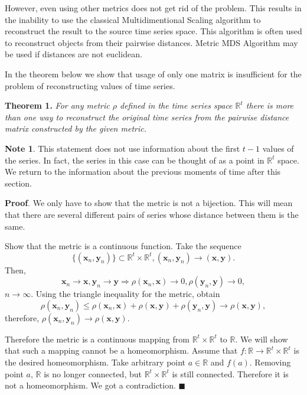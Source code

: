 \documentclass[12pt]{article}
\begin{document}
However, even using other metrics does not get rid of the problem. This results in the inability to use the classical Multidimentional Scaling \cite{MDS} algorithm to reconstruct the result to the source time series space. This algorithm is often used to reconstruct objects from their pairwise distances. Metric MDS Algorithm  \cite{inbook} may be used if distances are not euclidean.

In the theorem below we show that usage of only one matrix is insufficient for the problem of reconstructing values of time series.

\textbf{Theorem 1.} \emph{For any metric $\rho$ defined in the time series space $\mathbb{R}^t$ there is more than one way to reconstruct the original time series from the pairwise distance matrix constructed by the given metric.}	

\textbf{Note 1}. This statement does not use information about the first $t-1$ values of the series. In fact, the series in this case can be thought of as a point in $\mathbb{R}^t$ space. We return to the information about the previous moments of time after this section.

\textbf{Proof}. We only have to show that the metric is not a bijection. This will mean that there are several different pairs of series whose distance between them is the same.

Show that the metric is a continuous function. Take the sequence \[\{(\mathbf{x}_n, \mathbf{y}_n)\} \subset \mathbb{R}^t \times \mathbb{R}^t, (\mathbf{x}_n, \mathbf{y}_n) \to (\mathbf{x}, \mathbf{y}).\] Then, \[\mathbf{x}_n\to \mathbf{x}, \mathbf{y}_n\to \mathbf{y} \Rightarrow \rho(\mathbf{x}_n,\mathbf{x})\to 0 ,\rho(\mathbf{y}_n,\mathbf{y})\to 0,\] $n \to \infty.$ Using the triangle inequality for the metric, obtain \[\rho(\mathbf{x}_n,\mathbf{y}_n)\leqslant \rho(\mathbf{x}_n,\mathbf{x})+\rho(\mathbf{x},\mathbf{y})+\rho(\mathbf{y}_n,\mathbf{y})\to \rho(\mathbf{x},\mathbf{y}),\] therefore, $\rho(\mathbf{x}_n,\mathbf{y}_n)\to \rho(\mathbf{x},\mathbf{y})$.

Therefore the metric is a continuous mapping from $\mathbb{R}^t \times \mathbb{R}^t$ to $\mathbb{R}$. We will show that such a mapping cannot be a homeomorphism. Assume that $f: \mathbb{R} \to \mathbb{R}^t \times \mathbb{R}^t$ is the desired homeomorphism. Take arbitrary point $a \in \mathbb{R}$ and $f(a)$. Removing point $a$, $\mathbb{R}$ is no longer connected, but $\mathbb{R}^t \times \mathbb{R}^t$ is still connected. Therefore it is not a homeomorphism. We got a contradiction.
$\blacksquare$
\end{document}
